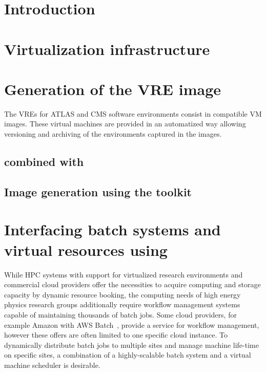 \section{Introduction}
\label{intro}


\section{Virtualization infrastructure}
\label{sec:openstack}


\section{Generation of the VRE image}
The VREs for ATLAS and CMS software environments consist in \Openstack compatible VM images.
These virtual machines are provided in an automatized
way allowing versioning and archiving of the environments captured in
the images.

\subsection{\Packer combined with \Puppet}





\subsection{Image generation using the \OZ toolkit}





\section{Interfacing batch systems and virtual resources using \Roced}
\label{section:roced}
While HPC systems with support for virtualized research environments and commercial cloud providers offer the
necessities to acquire computing and storage capacity by dynamic
resource booking, the computing needs of high energy physics
re\-search groups ad\-di\-tion\-al\-ly require work\-flow
ma\-na\-ge\-ment sys\-tems capable of maintaining thousands of batch
jobs. Some cloud providers, for example Amazon with AWS
Batch~\cite{awsbatch}, provide a service for workflow management,
however these offers are often limited to one specific cloud instance. To dynamically distribute batch jobs to multiple sites and manage machine life-time on specific sites, a combination of a highly-scalable batch system and a virtual machine scheduler is desirable.

